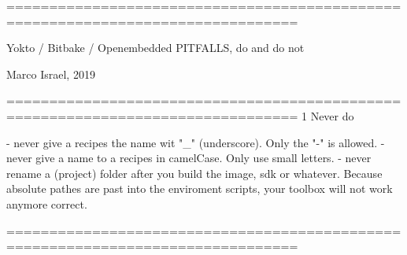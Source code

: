 ================================================================================

                    Yokto / Bitbake / Openembedded 
                        PITFALLS, do and do not

                            Marco Israel, 2019



================================================================================
1 Never do

- never give a recipes the name wit "_" (underscore). Only the "-" is allowed.
- never give a name to a recipes in camelCase. Only use small letters.
- never rename a (project) folder after you build the image, sdk or whatever.
  Because absolute pathes are past into the enviroment scripts, your toolbox
  will not work anymore correct.

================================================================================




